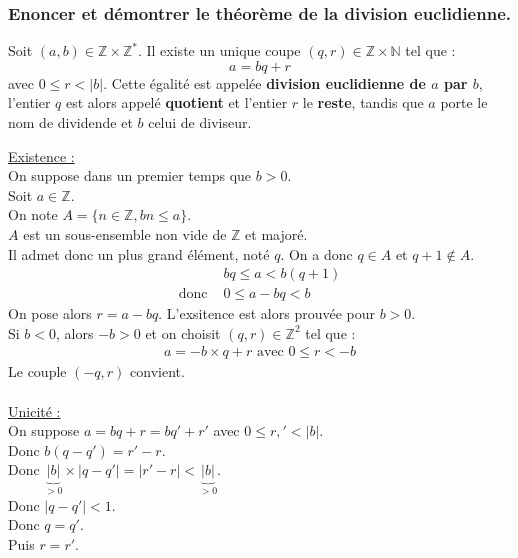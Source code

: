 \documentclass[titlepage, twoside]{report}
\begin{document}
\subsubsection{Enoncer et démontrer le théorème de la division euclidienne. }
\begin{tcolorbox}[title=Théorème 12.4, title filled=false, colframe=orange, colback=orange!10!white]
    Soit $(a,b) \in \mathbb{Z} \times \mathbb{Z}^*$. Il existe un unique coupe $(q,r) \in \mathbb{Z} \times \mathbb{N}$ tel que :
    $$a = bq + r$$
    avec $0 \leq r < |b|$. Cette égalité est appelée \textbf{division euclidienne de $a$ par $b$}, l'entier $q$ est alors appelé \textbf{quotient} et l'entier $r$ le \textbf{reste}, tandis que $a$ porte le nom de dividende et $b$ celui de diviseur. 
\end{tcolorbox}

\noindent\underline{Existence :} \\
On suppose dans un premier temps que $b > 0$. \\
Soit $a \in \mathbb{Z}$. \\
On note $A = \{ n \in \mathbb{Z}, bn \leq a \}$. \\
$A$ est un sous-ensemble non vide de $\mathbb{Z}$ et majoré. \\
Il admet donc un plus grand élément, noté $q$. 
On a donc $q \in A$ et $q + 1 \not \in A$. 
\begin{align*}
    &bq \leq a < b(q + 1) \\
    \text{donc } &0 \leq a - bq < b
\end{align*}
On pose alors $r = a - bq$. L'exsitence est alors prouvée pour $b > 0$. \\
Si $b < 0$, alors $-b > 0$ et on choisit $(q,r) \in \mathbb{Z}^2$ tel que :
\begin{align*}
    a = -b \times q + r \text{ avec } 0 \leq r < -b
\end{align*}
Le couple $(-q, r)$ convient. \\ \\

\noindent\underline{Unicité :} \\
On suppose $a = bq + r = bq' + r'$ avec $0 \leq r, ' < |b|$. \\
Donc $b(q-q') = r' - r$. \\
Donc $\underbrace{|b|}_{> 0} \times |q - q'| = |r' - r| < \underbrace{|b|}_{> 0}$. \\
Donc $|q - q'| < 1$. \\
Donc $q = q'$. \\
Puis $r = r'$. 
\end{document}

